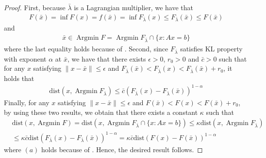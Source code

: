 \documentclass{article}
\numberwithin{equation}{section}
\def\Argmin{\mathop{\mathrm{Argmin}}}
\begin{document}
\begin{proof}
    First, because $\bar{\lambda}$ is a Lagrangian multiplier, we have that
    \begin{align}
        F(\bar{x}) =\inf F(x) = f(\bar{x}) = \inf F_{\bar{\lambda}}(x) \leq F_{\bar{\lambda}}(\bar{x}) 
        \leq F(\bar{x})   \nonumber
    \end{align}
    and 
    \begin{align}
        \bar{x} \in \Argmin F =\Argmin F_{\bar{\lambda}} \cap \{x: Ax=b\}   \nonumber
    \end{align}
    where the last equality holds because of \cite[Theorem 28.1]{Rockafellar+1970}.
    Second, since $F_{\bar{\lambda}}$ satisfies KL property with exponent $\alpha$ at $\bar{x}$, we have that there 
    exists $\epsilon>0$,  $r_0>0$ and $\bar{c}>0$ such that for any $x$ satisfying $\|x - \bar{x}\rVert \leq \epsilon$ and 
    $F_{\bar{\lambda}}(\bar{x})<F_{\bar{\lambda}}(x)< F_{\bar{\lambda}}(\bar{x})+ r_0$, it holds that 
    \begin{align}
        \mathrm{dist}(x,\Argmin F_{\bar{\lambda}}) \leq \bar{c}(F_{\bar{\lambda}}(x) - F_{\bar{\lambda}}(\bar{x}))^{1-\alpha} \nonumber
    \end{align}
    Finally, for any $x$ satisfying $\|x - \bar{x}\rVert \leq \epsilon$ and 
    $F(\bar{x})<F(x)< F(\bar{x})+ r_0$,  by using these two results, we obtain that there exists a constant $\kappa$ such that 
    \begin{align}
        &\mathrm{dist} (x, \Argmin F)  = \mathrm{dist} \left(x,\Argmin F_{\bar{\lambda}} \cap \{x: Ax=b\}\right) 
        \overset{\mathop{(a)}}{\leq} \kappa \mathrm{dist}(x, \Argmin F_{\bar{\lambda}}) \nonumber \\
        & \leq \kappa \bar{c} \mathrm{dist}(F_{\bar{\lambda}}(x) - F_{\bar{\lambda}}(\bar{x}))^{1-\alpha} = 
        \kappa \bar{c} \mathrm{dist}(F(x) - F(\bar{x}))^{1-\alpha}
    \end{align}
    where $(a)$ holds because of \cite[Corollary 3]{bauschke1999strong}.
    Hence, the desired result follows. 
\end{proof}
\end{document}

